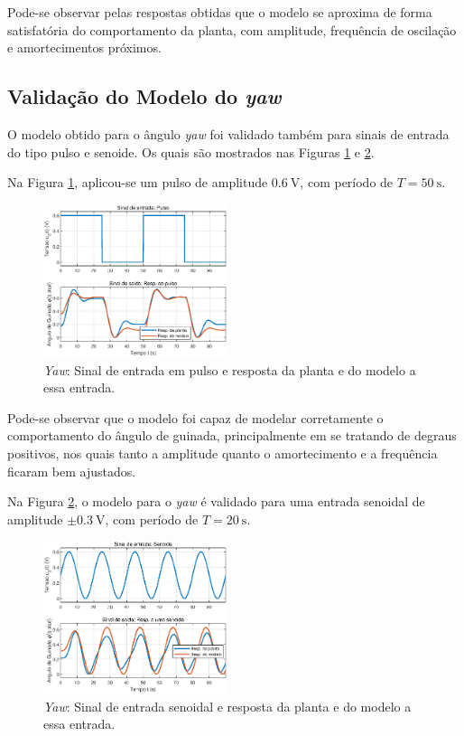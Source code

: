 Pode-se observar pelas respostas obtidas que o modelo se aproxima de forma satisfatória do comportamento da planta, com amplitude, frequência de oscilação e amortecimentos próximos.

\subsection{\textbf{Validação do Modelo do \textit{yaw}}}

O modelo obtido para o ângulo \textit{yaw} foi validado também para sinais de entrada do tipo pulso e senoide. Os quais são mostrados nas Figuras \ref{fig:ValidaYawPulso} e \ref{fig:ValidaYawSenoide}.

Na Figura \ref{fig:ValidaYawPulso}, aplicou-se um pulso de amplitude $\SI{0.6}{\volt}$, com período de $T = \SI{50}{\s}$.

\begin{figure}[H]
    \centering
    \includegraphics[width=0.48\textwidth]{figures/Validacao/ValidaYawPulso.eps}
    \caption{\textit{Yaw}: Sinal de entrada em pulso e resposta da planta e do modelo a essa entrada.}
    \label{fig:ValidaYawPulso}
\end{figure}

Pode-se observar que o modelo foi capaz de modelar corretamente o comportamento do ângulo de guinada, principalmente em se tratando de degraus positivos, nos quais tanto a amplitude quanto o amortecimento e a frequência ficaram bem ajustados.

Na Figura \ref{fig:ValidaYawSenoide}, o modelo para o \textit{yaw} é validado para uma entrada senoidal de amplitude $\pm \SI{0.3}{\volt}$, com período de $T = \SI{20}{\s}$.

\begin{figure}[H]
    \centering
    \includegraphics[width=0.48\textwidth]{figures/Validacao/ValidaYawSenoide.eps}
    \caption{\textit{Yaw}: Sinal de entrada senoidal e resposta da planta e do modelo a essa entrada.}
    \label{fig:ValidaYawSenoide}
\end{figure}


